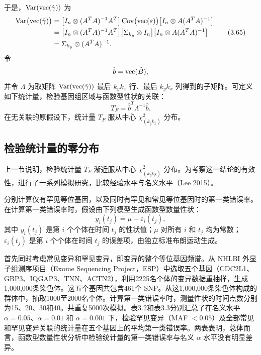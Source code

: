 于是，$\operatorname{Var}(\operatorname{vec}(\hat\gamma))$ 为
\begin{equation}
\begin{aligned}
\operatorname{Var}\bigl(\operatorname{vec}(\hat\gamma)\bigr)
&=\bigl[I_n\otimes(A^TA)^{-1}A^T\bigr]\operatorname{Cov}\bigl(\operatorname{vec}(\varepsilon)\bigr)
   \bigl[I_n\otimes A(A^TA)^{-1}\bigr]\\
&=\bigl[I_n\otimes(A^TA)^{-1}A^T\bigr]\bigl[\Sigma_{k_y}\otimes I_n\bigr]
   \bigl[I_n\otimes A(A^TA)^{-1}\bigr]\\
&=\Sigma_{k_y}\otimes(A^TA)^{-1}.
\end{aligned}
\tag{3.65}
\end{equation}
令
\[
\hat b=\operatorname{vec}(\hat B),
\]
并令 $\Lambda$ 为取矩阵 $\operatorname{Var}(\operatorname{vec}(\hat\gamma))$ 最后 $k_yk_x$ 行、最后 $k_yk_x$ 列得到的子矩阵。可定义如下统计量，检验基因组区域与函数型性状的关联：
\begin{equation}
T_F=\hat b^T\Lambda^{-1}\hat b.
\tag{3.66}
\end{equation}
在无关联的原假设下，统计量 $T_F$ 服从中心 $\chi^2_{(k_yk_x)}$ 分布。

\subsection{检验统计量的零分布}

上一节说明，检验统计量 $T_F$ 渐近服从中心 $\chi^2_{(k_yk_\beta)}$ 分布。为考察这一结论的有效性，进行了一系列模拟研究，比较经验水平与名义水平（Lee 2015）。

分别计算仅有罕见等位基因，以及同时有罕见和常见等位基因时的第一类错误率。在计算第一类错误率时，假设由下列模型生成函数型数量性状：
\[
y_i(t_j)=\mu+\varepsilon_i(t_j),
\]
其中 $y_i(t_j)$ 是第 $i$ 个个体在时间 $t_j$ 的性状值；$\mu$ 对所有 $i$ 和 $t_j$ 均为常数；$\varepsilon_i(t_j)$ 是第 $i$ 个个体在时间 $t_j$ 的误差项，由独立标准布朗运动生成。

首先同时考虑常见变异和罕见变异，即变异的整个等位基因频谱。从 NHLBI 外显子组测序项目（Exome Sequencing Project，ESP）中选取五个基因（CDC2L1、GBP3、IQGAP3、TNN、ACTN2），利用2225名个体的变异数据重抽样，生成1,000,000条染色体。这五个基因共包含461个 SNP。从这1,000,000条染色体构成的群体中，抽取1000至2000名个体。计算第一类错误率时，测量性状的时间点数分别为15、20、30和40。共重复5000次模拟。表3.2和表3.3分别汇总了在名义水平 $\alpha=0.05$、$\alpha=0.01$ 和 $\alpha=0.001$ 下，检验罕见变异（MAF $<0.05$）及全部常见和罕见变异关联的统计量在五个基因上的平均第一类错误率。两表表明，总体而言，函数型数量性状分析中检验统计量的第一类错误率与名义 $\alpha$ 水平没有明显差异。

